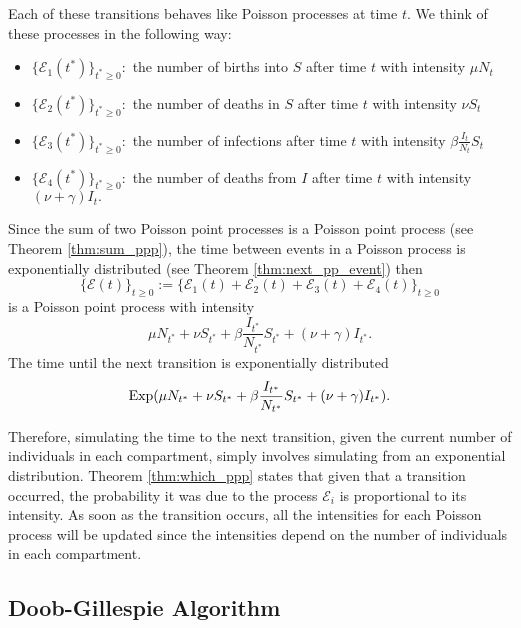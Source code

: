 Each of these transitions behaves like Poisson processes at time $t.$ We think
of these processes in the following way:
\begin{itemize}
    \item $\{\mathcal{E}_1(t^*)\}_{t^*\geq 0}:$
          the number of births into $S$ after time $t$ with intensity
          $\mu N_{t}$
    \item $\{\mathcal{E}_2(t^*)\}_{t^*\geq 0}:$
          the number of deaths in $S$ after time $t$ with intensity
          $\nu S_{t}$
    \item $\{\mathcal{E}_3(t^*)\}_{t^*\geq 0}:$
          the number of infections after time $t$ with intensity
          $\beta \frac{I_{t}}{N_{t}} S_{t}$
    \item $\{\mathcal{E}_4(t^*)\}_{t^*\geq 0}:$
          the number of deaths from $I$ after time $t$ with intensity
          $(\nu + \gamma) I_{t}.$
\end{itemize}

Since the sum of two Poisson point processes is a Poisson point process (see
Theorem \ref{thm:sum_ppp}), the time between events in a Poisson process
is exponentially distributed (see Theorem \ref{thm:next_pp_event})
then
$$
    \{\mathcal{E}(t)\}_{t\geq 0}:=\{\mathcal{E}_1(t) + \mathcal{E}_2(t)
    + \mathcal{E}_3(t) + \mathcal{E}_4(t)\}_{t\geq 0}
$$
is a Poisson point process with intensity
$$\mu N_{t^*} + \nu S_{t^*} + \beta \frac{I_{t^*}}{N_{t^*}} S_{t^*}
    + (\nu + \gamma) I_{t^*}.$$
The time until the next transition is exponentially distributed
$$
    \operatorname{Exp}(\mu N_{t^*} + \nu S_{t^*}
    + \beta \frac{I_{t^*}}{N_{t^*}} S_{t^*} + (\nu + \gamma) I_{t^*}).
$$

Therefore, simulating the time to the next transition, given
the current number of individuals in each compartment, simply involves
simulating from an exponential distribution. 
Theorem \ref{thm:which_ppp} states that 
given that a transition occurred, the probability it was due to 
the process
$\mathcal{E}_i$ is proportional to its intensity. As soon as the transition
occurs, all the intensities for each Poisson process will be updated since
the intensities depend on the number of individuals in each compartment.

\subsection*{Doob-Gillespie Algorithm}

